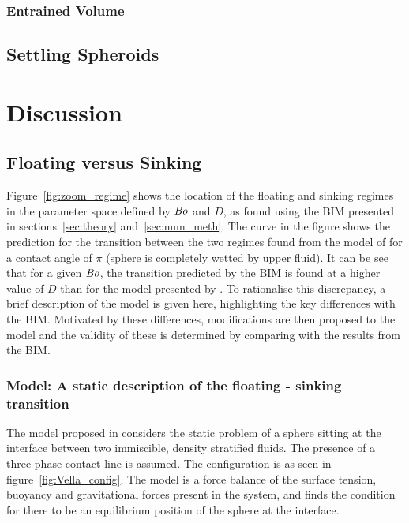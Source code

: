 \documentclass[12pt]{article}
\newcommand\Bo{\mbox{\textit{Bo}}}  %
\begin{document}
\subsubsection{Entrained Volume}
\label{subsubsec:ent_vol_res}


\subsection{Settling Spheroids}
\label{subsec:spheroids}


\section{Discussion}
\label{sec:discuss}

\subsection{Floating versus Sinking}
\label{subsec:float_sink_discuss}

Figure~\ref{fig:zoom_regime} shows the location of the floating and sinking regimes in the parameter space defined by $\Bo$ and $D$, as found using the BIM presented in sections~\ref{sec:theory} and~\ref{sec:num_meth}. The curve in the figure shows the prediction for the transition between the two regimes found from the model of \citet{Vella06} for a contact angle of $\pi$ (sphere is completely wetted by upper fluid). It can be see that for a given $\Bo$, the transition predicted by the BIM is found at a higher value of $D$ than for the model presented by \citet{Vella06}. To rationalise this discrepancy, a brief description of the \citet{Vella06} model is given here, highlighting the key differences with the BIM. Motivated by these differences, modifications are then proposed to the \citet{Vella06} model and the validity of these is determined by comparing with the results from the BIM.

\subsubsection{\citet{Vella06} Model: A static description of the floating - sinking transition}
\label{subsubsec:Vella_model}

The model proposed in \citet{Vella06} considers the static problem of a sphere sitting at the interface between two immiscible, density stratified fluids. The presence of a three-phase contact line is assumed. The configuration is as seen in figure~\ref{fig:Vella_config}. The model is a force balance of the surface tension, buoyancy and gravitational forces present in the system, and finds the condition for there to be an equilibrium position of the sphere at the interface. 
\end{document}
